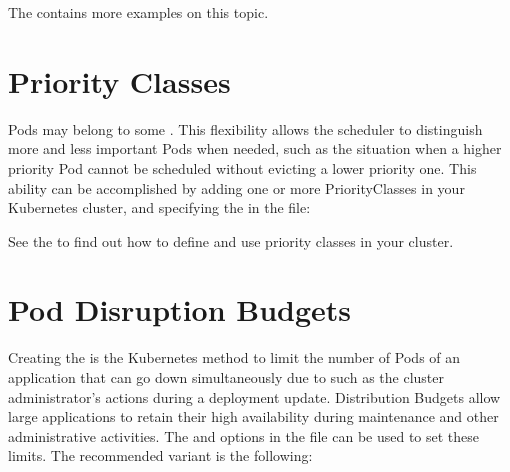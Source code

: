 \documentclass[letterpaper,10pt,english]{sphinxmanual}
\begin{document}
The 
contains more examples on this topic.


\section{Priority Classes}
\label{\detokenize{constraints:priority-classes}}
Pods may belong to some . This flexibility allows the scheduler to
distinguish more and less important Pods when needed, such as the situation when
a higher priority Pod cannot be scheduled without evicting a lower
priority one. This ability can be accomplished by adding one or more PriorityClasses in
your Kubernetes cluster, and specifying the  in the
file:

\begin{sphinxVerbatim}[commandchars=\\\{\}]
 
\end{sphinxVerbatim}

See the 
to find out how to define and use priority classes in your cluster.


\section{Pod Disruption Budgets}
\label{\detokenize{constraints:pod-disruption-budgets}}
Creating the 
is the Kubernetes method to limit the number of Pods of an application
that can go down simultaneously due to   such as the
cluster administrator’s actions during a deployment update. Distribution Budgets allow large applications
to retain their high availability during maintenance and other
administrative activities. The  and 
options in the
file can be used to set these limits. The recommended variant is the
following:
\end{document}
